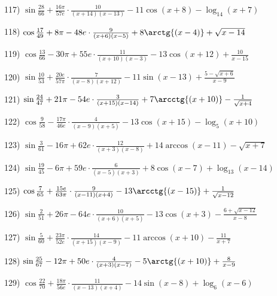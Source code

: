 \documentclass[11pt,ukrainian]{article}
\begin{document}
\smallskip\par
117) \space 
{ ${\sin\frac{28}{66}} + \frac{16{\pi}}{57 e}\cdot {\frac{10}{(x + 14)(x - 13)}} - {11\cos{(x + 8)}} - {\log_{14}(x + 7)}$}
\smallskip\par
118) \space 
{ ${\cos\frac{17}{49}} + 8{\pi} - 48 e\cdot {\frac{9}{(x + 6)(x - 5)}} + {8\arctg{(x - 4)}} + {\sqrt{x - 14}}$}
\smallskip\par
119) \space 
{ ${\cos\frac{13}{66}} - 30{\pi} + 55 e\cdot {\frac{11}{(x + 10)(x - 3)}} - {13\cos{(x + 12)}} + { \frac{10}{x - 15}}$}
\smallskip\par
120) \space 
{ ${\sin\frac{10}{53}} + \frac{20 e}{57{\pi}}\cdot {\frac{7}{(x - 8)(x + 12)}} - {11\sin{(x - 13)}} + {\frac{5 - \sqrt{x + 6}}{x - 9}}$}
\smallskip\par
121) \space 
{ ${\sin\frac{24}{47}} + 21{\pi} - 54 e\cdot {\frac{3}{(x + 15)(x - 14)}} + {7\arcctg{(x + 10)}} - {\frac{1}{\sqrt{x + 4}}}$}
\smallskip\par
122) \space 
{ ${\cos\frac{9}{58}} - \frac{17{\pi}}{46 e}\cdot {\frac{4}{(x - 9)(x + 5)}} - {13\cos{(x + 15)}} - {\log_{5}(x + 10)}$}
\smallskip\par
123) \space 
{ ${\sin\frac{3}{61}} - 16{\pi} + 62 e\cdot {\frac{12}{(x + 3)(x - 8)}} + {14\arccos{(x - 11)}} - {\sqrt{x + 7}}$}
\smallskip\par
124) \space 
{ ${\sin\frac{19}{45}} - 6{\pi} + 59 e\cdot {\frac{6}{(x - 5)(x + 3)}} + {8\cos{(x - 7)}} + {\log_{13}(x - 14)}$}
\smallskip\par
125) \space 
{ ${\cos\frac{7}{65}} + \frac{15 e}{63{\pi}}\cdot {\frac{9}{(x - 11)(x + 4)}} - {13\arcctg{(x - 15)}} + {\frac{1}{\sqrt{x - 12}}}$}
\smallskip\par
126) \space 
{ ${\sin\frac{2}{51}} + 26{\pi} - 64 e\cdot {\frac{10}{(x + 6)(x + 5)}} - {13\cos{(x + 3)}} - {\frac{6 + \sqrt{x - 12}}{x - 8}}$}
\smallskip\par
127) \space 
{ ${\sin\frac{5}{60}} + \frac{23{\pi}}{52 e}\cdot {\frac{14}{(x + 15)(x - 9)}} - {11\arccos{(x + 10)}} - { \frac{11}{x + 7}}$}
\smallskip\par
128) \space 
{ ${\sin\frac{25}{67}} - 12{\pi} + 50 e\cdot {\frac{4}{(x + 3)(x - 7)}} - {5\arctg{(x + 10)}} + { \frac{8}{x - 9}}$}
\smallskip\par
129) \space 
{ ${\cos\frac{22}{70}} + \frac{18{\pi}}{56 e}\cdot {\frac{11}{(x - 13)(x + 4)}} - {14\sin{(x - 8)}} + {\log_{6}(x - 6)}$}
\end{document}
